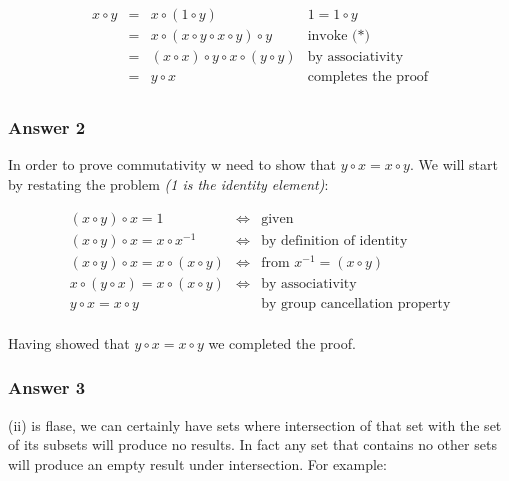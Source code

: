 \documentclass[11pt]{article}
\begin{document}
\begin{equation*}
  \begin{array}{llll}
    x \circ y & = & x \circ (1 \circ y)                           & \textrm{$1 = 1 \circ y$} \\
              & = & x \circ (x \circ y \circ x \circ y) \circ y   & \textrm{invoke (*)} \\
              & = & (x \circ x) \circ y \circ x \circ (y \circ y) & \textrm{by associativity} \\
              & = & y \circ x                                     & \textrm{completes the proof} \\
  \end{array}
\end{equation*}
\subsubsection{Answer 2}
\label{sec-1-1-2}

In order to prove commutativity w need to show that $y \circ x = x \circ y$.
We will start by restating the problem \emph{(1 is the identity element)}:

\begin{equation*}
  \begin{array}{lll}
    (x \circ y) \circ x = 1                  & \iff &
    \textrm{given} \\
    (x \circ y) \circ x = x \circ x^{-1}      & \iff &
    \textrm{by definition of identity} \\
    (x \circ y) \circ x = x \circ (x \circ y) & \iff &
    \textrm{from $x^{-1} = (x \circ y)$} \\
    x \circ (y \circ x) = x \circ (x \circ y) & \iff &
    \textrm{by associativity} \\
    y \circ x = x \circ y                     &      &
    \textrm{by group cancellation property} \\
  \end{array}
\end{equation*}

Having showed that $y \circ x = x \circ y$ we completed the proof.
\subsubsection{Answer 3}
\label{sec-1-1-3}
(ii) is flase, we can certainly have sets where intersection of that set with
the set of its subsets will produce no results.  In fact any set that contains
no other sets will produce an empty result under intersection.  For example:
\end{document}
